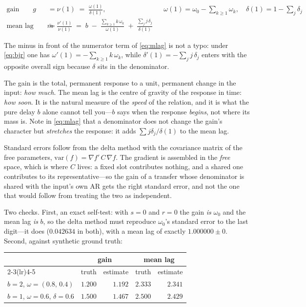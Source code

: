 \documentclass[11pt,a4paper]{article}
\theoremstyle{plain}
\theoremstyle{remark}
\begin{document}
\begin{align}
\text{gain}\qquad
 g &= \nu(1) \;=\; \frac{\omega(1)}{\delta(1)},
 && \omega(1)=\omega_0-\!\!\sum_{k\ge 1}\!\omega_k,\quad \delta(1)=1-\sum_j \delta_j
 \label{eq:gain}\\[4pt]
\text{mean lag}\qquad
 \bar{m} &= \frac{\nu'(1)}{\nu(1)}
   \;=\; b \;-\; \frac{\sum_{k\ge 1} k\,\omega_k}{\omega(1)}
             \;+\; \frac{\sum_j j\,\delta_j}{\delta(1)}
 \label{eq:mlag}
\end{align}

The minus in front of the numerator term of \eqref{eq:mlag} is not a typo: under
\eqref{eq:bjr} one has $\omega'(1) = -\sum_{k\ge1} k\,\omega_k$, while
$\delta'(1) = -\sum_j j\,\delta_j$ enters with the opposite overall sign because
$\delta$ sits in the denominator.

The gain is the total, permanent response to a unit, permanent change in the
input: \emph{how much}. The mean lag is the centre of gravity of the response in
time: \emph{how soon}. It is the natural measure of the \emph{speed} of the
relation, and it is what the pure delay $b$ alone cannot tell you---$b$ says when
the response \emph{begins}, not where its mass is. Note in \eqref{eq:mlag} that a
denominator does not change the gain's character but \emph{stretches} the
response: it adds $\sum j\delta_j/\delta(1)$ to the mean lag.

Standard errors follow from the delta method with the covariance matrix of the
free parameters, $\mathrm{var}(f) = \nabla f' \, C \, \nabla f$. The gradient is
assembled in the \emph{free} space, which is where $C$ lives: a fixed slot
contributes nothing, and a shared one contributes to its representative---so the
gain of a transfer whose denominator is shared with the input's own AR gets the
right standard error, and not the one that would follow from treating the two as
independent.

Two checks. First, an exact self-test: with $s=0$ and $r=0$ the gain \emph{is}
$\omega_0$ and the mean lag \emph{is} $b$, so the delta method must reproduce
$\omega_0$'s standard error to the last digit---it does ($0.042634$ in both), with
a mean lag of exactly $1.000000 \pm 0$. Second, against synthetic ground truth:

\begin{center}
\begin{tabular}{lrrrr}
\toprule
 & \multicolumn{2}{c}{gain} & \multicolumn{2}{c}{mean lag} \\
\cmidrule(lr){2-3}\cmidrule(lr){4-5}
 & truth & estimate & truth & estimate \\
\midrule
$b=2$, $\omega=(0.8,\,0.4)$              & $1.200$ & $1.192$ & $2.333$ & $2.341$ \\
$b=1$, $\omega=0.6$, $\delta=0.6$        & $1.500$ & $1.467$ & $2.500$ & $2.429$ \\
\bottomrule
\end{tabular}
\end{center}
\end{document}
